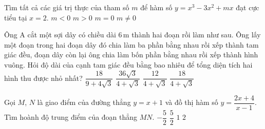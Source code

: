 \begin{ex}%
	Tìm tất cả các giá trị thực của tham số $m$ để hàm số $y=x^3-3x^2+mx$ đạt cực tiểu tại $x=2$.
	\choice
	{$m<0$}
	{$m>0$}
	{$m=0$}
	{$m\neq 0$}
\end{ex}
\begin{ex}%
	Ông A cắt một sợi dây có chiều dài $6\mathrm{\,m}$ thành hai đoạn rồi làm như sau. Ông lấy một đoạn trong hai đoạn dây đó chia làm ba phần bằng nhau rồi xếp thành tam giác đều, đoạn dây còn lại ông chia làm bốn phần bằng nhau rồi xếp thành hình vuông. Hỏi độ dài của cạnh tam giác đều bằng bao nhiêu để tổng diện tích hai hình thu được nhỏ nhất?
	\choice
	{\True $\dfrac{18}{9+4\sqrt{3}}$}
	{$\dfrac{36\sqrt{3}}{4+\sqrt{3}}$}
	{$\dfrac{12}{4+\sqrt{3}}$}
	{$\dfrac{18}{4+\sqrt{3}}$}
\end{ex}
\begin{ex}%
	Gọi $M$, $N$ là giao điểm của đường thẳng $y=x+1$ và đồ thị hàm số $y=\dfrac{2x+4}{x-1}$. Tìm hoành độ trung điểm của đoạn thẳng $MN$.
	\choice
	{$-\dfrac{5}{2}$}
	{$\dfrac{5}{2}$}
	{\True $1$}
	{$2$}
\end{ex}

